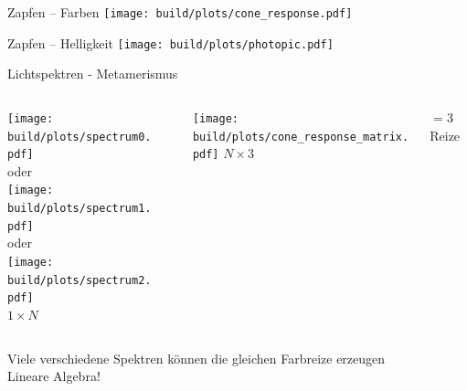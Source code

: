 \documentclass[aspectratio=1610, 9pt]{beamer}
\begin{document}
\begin{frame}[c, plain]
  \centering
\end{frame}

\begin{frame}[c, plain]
\end{frame}


\begin{frame}[t]{Zapfen – Farben}
  \texttt{[image: build/plots/cone\_response.pdf]} 
\end{frame}

\begin{frame}[t]{Zapfen – Helligkeit}
  \texttt{[image: build/plots/photopic.pdf]} 
\end{frame}


\begin{frame}{Lichtspektren - Metamerismus}

  \begin{columns}[onlytextwidth]
    \begin{column}{0.35\textwidth}
      \centering%
      \texttt{[image: build/plots/spectrum0.pdf]}\\[0.2cm]
      oder\\
      \texttt{[image: build/plots/spectrum1.pdf]}\\[0.2cm]
      oder\\
      \texttt{[image: build/plots/spectrum2.pdf]}\\[0.2cm]
      \Huge $1\times N$
    \end{column}
    \begin{column}{0.04\textwidth}
    \end{column}
    \begin{column}{0.35\textwidth}
      \centering%
      \texttt{[image: build/plots/cone\_response\_matrix.pdf]}
      \Huge $N \times 3$
    \end{column}
    \begin{column}{0.20\textwidth}
      \Huge ${}=3$ Reize
    \end{column}
  \end{columns}
  \vspace{0.5cm}
  Viele verschiedene Spektren können die gleichen Farbreize erzeugen \\
  Lineare Algebra!
\end{frame}
\end{document}
